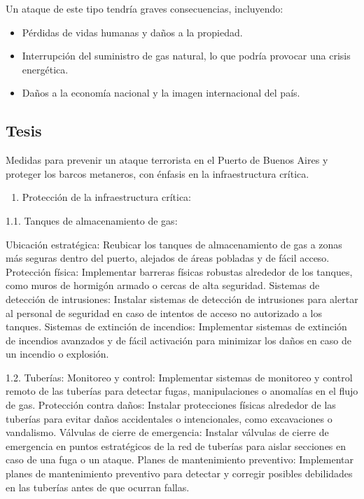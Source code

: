 \documentclass{article}
\providecommand{\tightlist}{%
  \setlength{\itemsep}{0pt}\setlength{\parskip}{0pt}}
\begin{document}
Un ataque de este tipo tendría graves consecuencias, incluyendo:

\begin{itemize}
\tightlist
\item
  Pérdidas de vidas humanas y daños a la propiedad.
\item
  Interrupción del suministro de gas natural, lo que podría provocar una
  crisis energética.
\item
  Daños a la economía nacional y la imagen internacional del país.
\end{itemize}

\hypertarget{tesis}{%
\subsection{Tesis}\label{tesis}}

Medidas para prevenir un ataque terrorista en el Puerto de Buenos Aires
y proteger los barcos metaneros, con énfasis en la infraestructura
crítica.

\begin{enumerate}
\def\labelenumi{\arabic{enumi}.}
\tightlist
\item
  Protección de la infraestructura crítica:
\end{enumerate}

1.1. Tanques de almacenamiento de gas:

Ubicación estratégica: Reubicar los tanques de almacenamiento de gas a
zonas más seguras dentro del puerto, alejados de áreas pobladas y de
fácil acceso. Protección física: Implementar barreras físicas robustas
alrededor de los tanques, como muros de hormigón armado o cercas de alta
seguridad. Sistemas de detección de intrusiones: Instalar sistemas de
detección de intrusiones para alertar al personal de seguridad en caso
de intentos de acceso no autorizado a los tanques. Sistemas de extinción
de incendios: Implementar sistemas de extinción de incendios avanzados y
de fácil activación para minimizar los daños en caso de un incendio o
explosión.

1.2. Tuberías: Monitoreo y control: Implementar sistemas de monitoreo y
control remoto de las tuberías para detectar fugas, manipulaciones o
anomalías en el flujo de gas. Protección contra daños: Instalar
protecciones físicas alrededor de las tuberías para evitar daños
accidentales o intencionales, como excavaciones o vandalismo. Válvulas
de cierre de emergencia: Instalar válvulas de cierre de emergencia en
puntos estratégicos de la red de tuberías para aislar secciones en caso
de una fuga o un ataque. Planes de mantenimiento preventivo: Implementar
planes de mantenimiento preventivo para detectar y corregir posibles
debilidades en las tuberías antes de que ocurran fallas.
\end{document}
